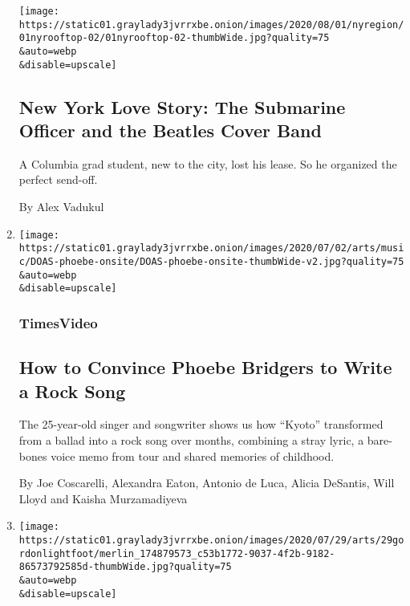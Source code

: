 \begin{enumerate}
  \texttt{[image: https://static01.graylady3jvrrxbe.onion/images/2020/08/01/nyregion/01nyrooftop-02/01nyrooftop-02-thumbWide.jpg?quality=75\\\&auto=webp\\\&disable=upscale]}

  \hypertarget{new-york-love-story-the-submarine-officer-and-the-beatles-cover-band}{%
  \subsection{New York Love Story: The Submarine Officer and the Beatles
  Cover
  Band}\label{new-york-love-story-the-submarine-officer-and-the-beatles-cover-band}}

  A Columbia grad student, new to the city, lost his lease. So he
  organized the perfect send-off.

  By Alex Vadukul
\item
  \href{/video/arts/music/100000007258359/phoebe-bridgers-kyoto.html}{}

  \texttt{[image: https://static01.graylady3jvrrxbe.onion/images/2020/07/02/arts/music/DOAS-phoebe-onsite/DOAS-phoebe-onsite-thumbWide-v2.jpg?quality=75\\\&auto=webp\\\&disable=upscale]}

  \hypertarget{timesvideo}{%
  \subsubsection{TimesVideo}\label{timesvideo}}

  \hypertarget{how-to-convince-phoebe-bridgers-to-write-a-rock-song}{%
  \subsection{How to Convince Phoebe Bridgers to Write a Rock
  Song}\label{how-to-convince-phoebe-bridgers-to-write-a-rock-song}}

  The 25-year-old singer and songwriter shows us how ``Kyoto''
  transformed from a ballad into a rock song over months, combining a
  stray lyric, a bare-bones voice memo from tour and shared memories of
  childhood.

  By Joe Coscarelli, Alexandra Eaton, Antonio de Luca, Alicia DeSantis,
  Will Lloyd and Kaisha Murzamadiyeva
\item
  \href{/2020/07/29/movies/gordon-lightfoot-if-you-could-read-my-mind-review.html}{}

  \texttt{[image: https://static01.graylady3jvrrxbe.onion/images/2020/07/29/arts/29gordonlightfoot/merlin\_174879573\_c53b1772-9037-4f2b-9182-86573792585d-thumbWide.jpg?quality=75\\\&auto=webp\\\&disable=upscale]}


\end{enumerate}
